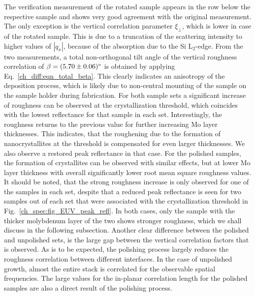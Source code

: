 The verification measurement of the rotated sample appears in the row below the respective sample and shows very good agreement with the original measurement. The only exception is the vertical correlation parameter $\xi_\perp$, which is lower in case of the rotated sample. This is due to a truncation of the scattering intensity to higher values of $|q_x|$, because of the absorption due to the Si L$_2$-edge. From the two measurements, a total non-orthogonal tilt angle of the vertical roughness correlation of $\beta = \SI{5.70\pm 0.06}{\degree}$ is obtained by applying Eq.~\eqref{ch_diff:eqn_total_beta}. This clearly indicates an anisotropy of the deposition process, which is likely due to non-central mounting of the sample on the sample holder during fabrication. For both sample sets a significant increase of roughness can be observed at the crystallization threshold, which coincides with the lowest reflectance for that sample in each set. Interestingly, the roughness returns to the previous value for further increasing Mo layer thicknesses. This indicates, that the roughening due to the formation of nanocrystallites at the threshold is compensated for even larger thicknesses. We also observe a restored peak reflectance in that case. For the polished samples, the formation of crystallites can be observed with similar effects, but at lower Mo layer thickness with overall significantly lower root mean square roughness values. It should be noted, that the strong roughness increase is only observed for one of the samples in each set, despite that a reduced peak reflectance is seen for two samples out of each set that were associated with the crystallization threshold in Fig.~\ref{ch_spec:fig_EUV_peak_refl}. In both cases, only the sample with the thicker molybdenum layer of the two shows stronger roughness, which we shall discuss in the following subsection. Another clear difference between the polished and unpolished sets, is the large gap between the vertical correlation factors that is observed. As is to be expected, the polishing process largely reduces the roughness correlation between different interfaces. In the case of unpolished growth, almost the entire stack is correlated for the observable spatial frequencies. The large values for the in-planar correlation length for the polished samples are also a direct result of the polishing process.

